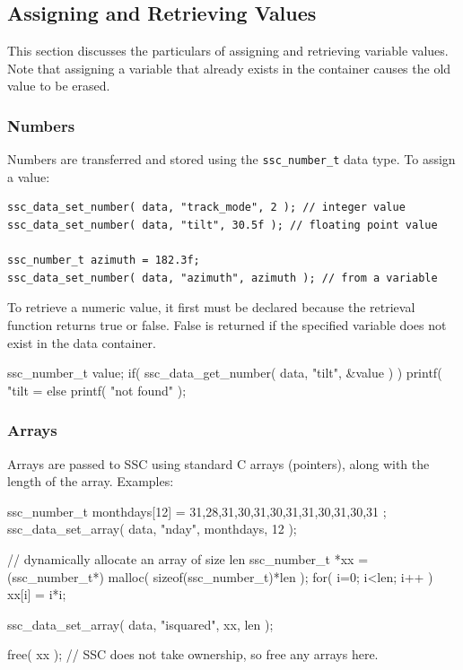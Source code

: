 \documentclass{scrartcl} %
\begin{document}
\subsection{Assigning and Retrieving Values}

This section discusses the particulars of assigning and retrieving variable values.  Note that assigning a variable that already exists in the container causes the old value to be erased.

\subsubsection{Numbers}

Numbers are transferred and stored using the \texttt{ssc\_number\_t} data type.  To assign a value:

\begin{verbatim}
ssc_data_set_number( data, "track_mode", 2 ); // integer value
ssc_data_set_number( data, "tilt", 30.5f ); // floating point value

ssc_number_t azimuth = 182.3f;
ssc_data_set_number( data, "azimuth", azimuth ); // from a variable
\end{verbatim}

To retrieve a numeric value, it first must be declared because the retrieval function returns true or false.  False is returned if the specified variable does not exist in the data container.

\begin{verbatimtab}[4]
ssc_number_t value;
if( ssc_data_get_number( data, "tilt", &value ) )
	printf( "tilt = %
else
	printf( "not found\n" );
\end{verbatimtab}

\subsubsection{Arrays}

Arrays are passed to SSC using standard C arrays (pointers), along with the length of the array. Examples:

\begin{verbatimtab}
ssc_number_t monthdays[12] = { 31,28,31,30,31,30,31,31,30,31,30,31 };
ssc_data_set_array( data, "nday", monthdays, 12 );

// dynamically allocate an array of size len
ssc_number_t *xx = (ssc_number_t*) malloc( sizeof(ssc_number_t)*len );
for( i=0; i<len; i++ ) xx[i] = i*i;

ssc_data_set_array( data, "isquared", xx, len );

free( xx ); // SSC does not take ownership, so free any arrays here.
\end{verbatimtab}
\end{document}
